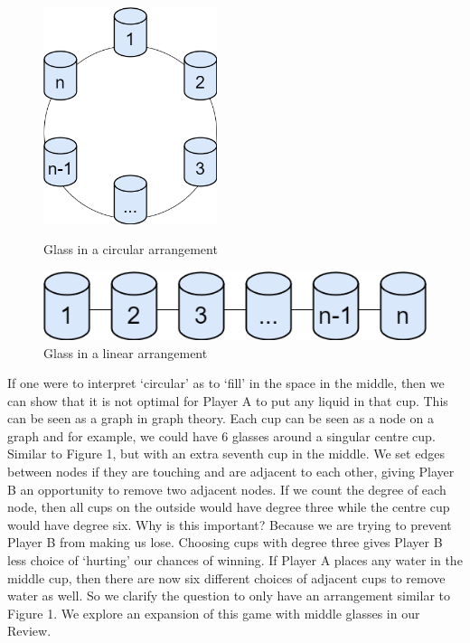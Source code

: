 \documentclass[11pt]{article}
\newcommand{\keywordfont}{\textsc}
\newcommand{\keyword}[1]{%
  \marginpar{\raggedright\small\keywordfont{#1}}}
\begin{document}
\begin{figure}[h]
    \centering
    \begin{minipage}{0.5\textwidth}
        \centering
        \includegraphics[width=2in]{Glass.png} 
        \caption{Glass in a circular arrangement}
       
    \end{minipage}%
    \begin{minipage}{0.5\textwidth}
        \centering
        \includegraphics[width=\linewidth]{GlassLine.png} 
        \caption{Glass in a linear arrangement}
    \end{minipage}
\end{figure}

If one were \keyword{Clarification} to interpret `circular' as to `fill' in the space in the middle, then we can show that it is not optimal for Player A to put any liquid in that cup. This can be seen as a graph in graph theory. Each cup can be seen as a node on a graph and for example, we could have 6 glasses around a singular centre cup. Similar to Figure 1, but with an extra seventh cup in the middle. We set edges between nodes if they are touching and are adjacent to each other, giving Player B an opportunity to remove two adjacent nodes. If we count the degree of each node, then all cups on the outside would have degree three while the centre cup would have degree six. Why is this important? Because we are trying to prevent Player B from making us lose. Choosing cups with degree three gives Player B less choice of `hurting' our chances of winning. If Player A places any water in the middle cup, then there are now six different choices of adjacent cups to remove water as well. So we clarify the question to only have an arrangement similar to Figure 1. We explore an expansion of this game with middle glasses in our Review.
\end{document}
